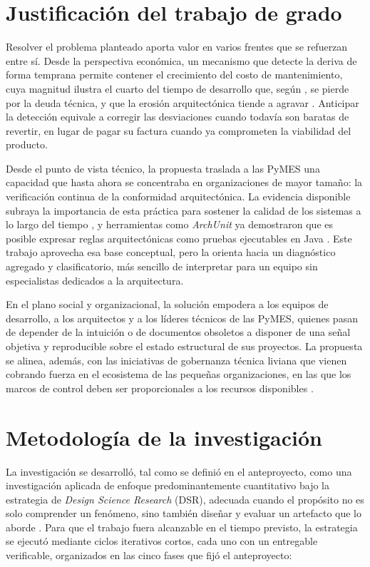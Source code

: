 \section{Justificación del trabajo de grado}
Resolver el problema planteado aporta valor en varios frentes que se refuerzan entre sí. Desde la perspectiva económica, un mecanismo que detecte la deriva de forma temprana permite contener el crecimiento del costo de mantenimiento, cuya magnitud ilustra el cuarto del tiempo de desarrollo que, según \citet{Besker2019}, se pierde por la deuda técnica, y que la erosión arquitectónica tiende a agravar \citep{Pigazzini2021, Li2022}. Anticipar la detección equivale a corregir las desviaciones cuando todavía son baratas de revertir, en lugar de pagar su factura cuando ya comprometen la viabilidad del producto.

Desde el punto de vista técnico, la propuesta traslada a las PyMES una capacidad que hasta ahora se concentraba en organizaciones de mayor tamaño: la verificación continua de la conformidad arquitectónica. La evidencia disponible subraya la importancia de esta práctica para sostener la calidad de los sistemas a lo largo del tiempo \citep{Klein2022}, y herramientas como \textit{ArchUnit} ya demostraron que es posible expresar reglas arquitectónicas como pruebas ejecutables en Java \citep{ArchUnit}. Este trabajo aprovecha esa base conceptual, pero la orienta hacia un diagnóstico agregado y clasificatorio, más sencillo de interpretar para un equipo sin especialistas dedicados a la arquitectura.

En el plano social y organizacional, la solución empodera a los equipos de desarrollo, a los arquitectos y a los líderes técnicos de las PyMES, quienes pasan de depender de la intuición o de documentos obsoletos a disponer de una señal objetiva y reproducible sobre el estado estructural de sus proyectos. La propuesta se alinea, además, con las iniciativas de gobernanza técnica liviana que vienen cobrando fuerza en el ecosistema de las pequeñas organizaciones, en las que los marcos de control deben ser proporcionales a los recursos disponibles \citep{LAIG2025}.

\section{Metodología de la investigación}
La investigación se desarrolló, tal como se definió en el anteproyecto, como una investigación aplicada de enfoque predominantemente cuantitativo bajo la estrategia de \textit{Design Science Research} (DSR), adecuada cuando el propósito no es solo comprender un fenómeno, sino también diseñar y evaluar un artefacto que lo aborde \citep{Hevner2004, Peffers2007}. Para que el trabajo fuera alcanzable en el tiempo previsto, la estrategia se ejecutó mediante ciclos iterativos cortos, cada uno con un entregable verificable, organizados en las cinco fases que fijó el anteproyecto:

